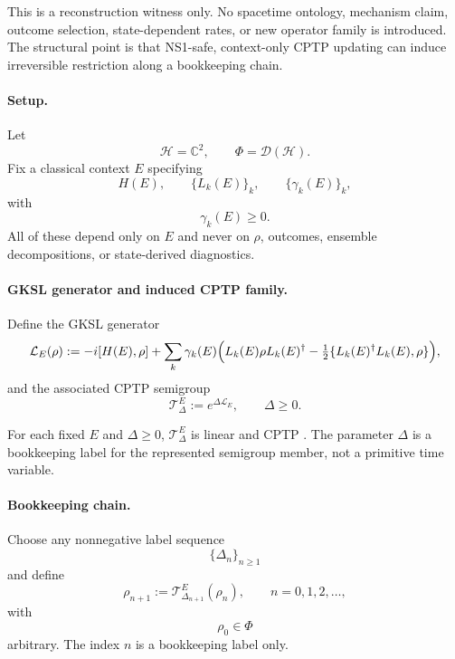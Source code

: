 \documentclass[aps,prx,onecolumn,11pt]{revtex4-2}
\theoremstyle{plain}
\theoremstyle{definition}
\theoremstyle{remark}
\begin{document}
This is a reconstruction witness only. No spacetime ontology,
mechanism claim, outcome selection, state-dependent rates, or new
operator family is introduced. The structural point is that NS1-safe,
context-only CPTP updating can induce irreversible restriction along a
bookkeeping chain.

\paragraph{Setup.}

Let
\[
\mathcal H=\mathbb C^2,
\qquad
\Phi=\mathcal D(\mathcal H).
\]
Fix a classical context \(E\) specifying
\[
H(E),
\qquad
\{L_k(E)\}_k,
\qquad
\{\gamma_k(E)\}_k,
\]
with
\[
\gamma_k(E)\geq 0.
\]
All of these depend only on \(E\) and never on \(\rho\), outcomes,
ensemble decompositions, or state-derived diagnostics.

\paragraph{GKSL generator and induced CPTP family.}

Define the GKSL generator~\cite{Lindblad1976,Gorini1976}
\begin{equation}
\mathcal L_E(\rho)
:=
-i[H(E),\rho]
+
\sum_k
\gamma_k(E)
\Bigl(
L_k(E)\rho L_k(E)^\dagger
-
\tfrac{1}{2}
\{L_k(E)^\dagger L_k(E),\rho\}
\Bigr),
\label{eq:gksl_generator_NS1_safe}
\end{equation}
and the associated CPTP semigroup
\begin{equation}
\mathcal T^E_{\Delta}
:=
e^{\Delta\mathcal L_E},
\qquad
\Delta\geq 0.
\label{eq:cptp_semigroup_NS1_safe}
\end{equation}

For each fixed \(E\) and \(\Delta\geq 0\),
\(\mathcal T^E_{\Delta}\) is linear and CPTP
\cite{Watrous2018,NielsenChuang2010}. The parameter \(\Delta\) is a
bookkeeping label for the represented semigroup member, not a primitive
time variable.

\paragraph{Bookkeeping chain.}

Choose any nonnegative label sequence
\[
\{\Delta_n\}_{n\geq 1}
\]
and define
\begin{equation}
\rho_{n+1}
:=
\mathcal T^E_{\Delta_{n+1}}(\rho_n),
\qquad
n=0,1,2,\ldots,
\label{eq:sequencing_chain_NS1_safe}
\end{equation}
with
\[
\rho_0\in\Phi
\]
arbitrary. The index \(n\) is a bookkeeping label only.
\end{document}
